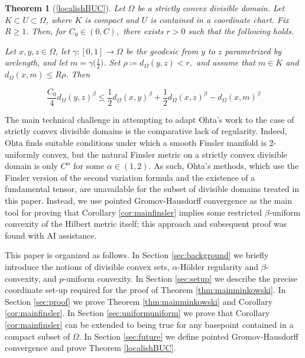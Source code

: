 \documentclass[letterpaper, 11pt, reqno]{amsart}
\newtheorem*{theorem*}{Theorem}
\theoremstyle{definition}
\begin{document}
\begin{theorem*}[\ref{localishBUC}]
    Let $\Omega$ be a strictly convex divisible domain. Let $K \subset U \subset \Omega$, where $K$ is compact and $U$ is contained in a coordinate chart. Fix $R \geq 1.$ Then, for $C_0 \in (0,C),$ there exists $r>0$ such that the following holds.

Let $x, y, z\in \Omega$, let $\gamma:[0,1]\longrightarrow  \Omega$ be the geodesic from $y$ to $z$ parametrized by arclength, and let $m=\gamma\big(\frac{1}{2}\big)$. Set $\rho \coloneqq d_\Omega(y,z) < r,$ and assume that $m \in K$ and $d_\Omega(x,m) \leq R\rho$. Then

\begin{equation}%
        \frac{C_0}{4}d_\Omega(y,z)^\beta \leq \frac{1}{2}d_\Omega(x,y)^\beta +
\frac{1}{2}d_\Omega(x,z)^\beta  - d_\Omega(x,m)^\beta
\end{equation}
\end{theorem*}

The main technical challenge in attempting to adapt Ohta's work to the case of strictly convex divisible domains is the comparative lack of regularity. Indeed, Ohta finds suitable conditions under which a smooth Finsler manifold is 2-uniformly convex, but the natural Finsler metric on a strictly convex divisible domain is only $C^\alpha$ for some $\alpha \in (1,2)$. As such, Ohta's methods, which use the Finsler version of the second variation formula and the existence of a fundamental tensor, are unavailable for the subset of divisible domains treated in this paper. Instead, we use pointed Gromov-Hausdorff convergence as the main tool for proving that Corollary \ref{cor:mainfinsler} implies some restricted $\beta$-uniform convexity of the Hilbert metric itself; this approach and subsequent proof was found with AI assistance.

This paper is organized as follows. In Section \ref{sec:background} we briefly introduce the notions of divisible convex sets, $\alpha$-H{\"o}lder regularity and $\beta$-convexity, and $p$-uniform convexity. In Section \ref{sec:setup} we describe the precise coordinate set-up required for the proof of Theorem \ref{thm:mainminkowski}. In Section \ref{sec:proof} we prove Theorem \ref{thm:mainminkowski} and Corollary \ref{cor:mainfinsler}. In Section \ref{sec:uniformuniform} we prove that Corollary \ref{cor:mainfinsler} can be extended to being true for any basepoint contained in a compact subset of $\Omega$. In Section \ref{sec:future} we define pointed Gromov-Hausdorff convergence and prove Theorem \ref{localishBUC}.
\end{document}
